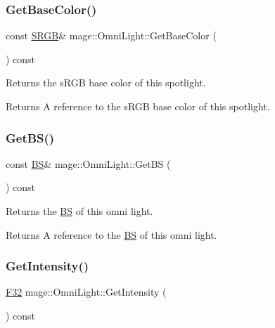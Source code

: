 \subsubsection{\texorpdfstring{Get\+Base\+Color()}{GetBaseColor()}\hspace{0.1cm}{\footnotesize\ttfamily [2/2]}}
{\footnotesize\ttfamily const \hyperlink{structmage_1_1_s_r_g_b}{S\+R\+GB}\& mage\+::\+Omni\+Light\+::\+Get\+Base\+Color (\begin{DoxyParamCaption}{ }\end{DoxyParamCaption}) const\hspace{0.3cm}{\ttfamily [noexcept]}}

Returns the s\+R\+GB base color of this spotlight.

\begin{DoxyReturn}{Returns}
A reference to the s\+R\+GB base color of this spotlight. 
\end{DoxyReturn}
\hypertarget{classmage_1_1_omni_light_ad38916c3db0ece0ef0b23044c827a425}{}\label{classmage_1_1_omni_light_ad38916c3db0ece0ef0b23044c827a425} 
\subsubsection{\texorpdfstring{Get\+B\+S()}{GetBS()}}
{\footnotesize\ttfamily const \hyperlink{classmage_1_1_b_s}{BS}\& mage\+::\+Omni\+Light\+::\+Get\+BS (\begin{DoxyParamCaption}{ }\end{DoxyParamCaption}) const\hspace{0.3cm}{\ttfamily [noexcept]}}

Returns the \hyperlink{classmage_1_1_b_s}{BS} of this omni light.

\begin{DoxyReturn}{Returns}
A reference to the \hyperlink{classmage_1_1_b_s}{BS} of this omni light. 
\end{DoxyReturn}
\hypertarget{classmage_1_1_omni_light_ae7309fdbe54b5d6bc6d4e20990ba6bdc}{}\label{classmage_1_1_omni_light_ae7309fdbe54b5d6bc6d4e20990ba6bdc} 
\subsubsection{\texorpdfstring{Get\+Intensity()}{GetIntensity()}}
{\footnotesize\ttfamily \hyperlink{namespacemage_aa97e833b45f06d60a0a9c4fc22ae02c0}{F32} mage\+::\+Omni\+Light\+::\+Get\+Intensity (\begin{DoxyParamCaption}{ }\end{DoxyParamCaption}) const\hspace{0.3cm}{\ttfamily [noexcept]}}

